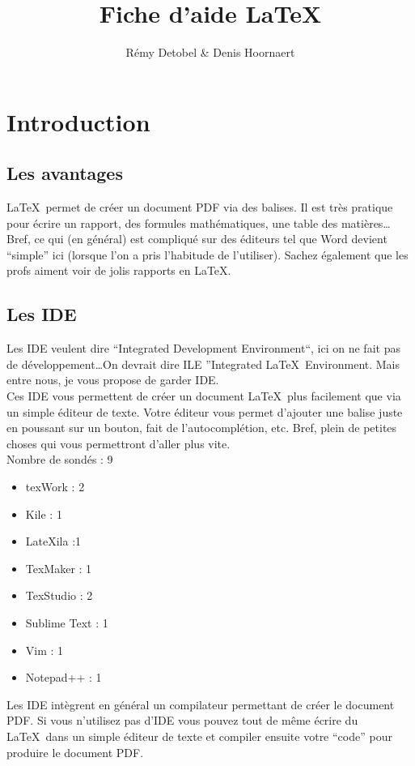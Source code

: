 \documentclass[a4paper,11pt]{article}
\title{Fiche d'aide \LaTeX}
\author{Rémy Detobel \& Denis Hoornaert}
\begin{document}
\maketitle

\newpage
\tableofcontents
\newpage


\section{Introduction}
  \subsection{Les avantages}
    \LaTeX\ permet de créer un document PDF via des balises.  Il est très pratique pour écrire un rapport, des formules mathématiques, une table des matières\ldots  Bref, ce qui (en général) est compliqué sur des éditeurs tel que Word devient ``simple'' ici (lorsque l'on a pris l'habitude de l'utiliser).  Sachez également que les profs aiment voir de jolis rapports en \LaTeX.

  \subsection{Les IDE}
    Les IDE veulent dire ``Integrated Development Environment``, ici on ne fait pas de développement\ldots On devrait dire ILE ''Integrated \LaTeX\ Environment.  Mais entre nous, je vous propose de garder IDE.\\
    Ces IDE vous permettent de créer un document \LaTeX\ plus facilement que via un simple éditeur de texte.  Votre éditeur vous permet d'ajouter une balise juste en poussant sur un bouton, fait de l'autocomplétion, etc.  Bref, plein de petites choses qui vous permettront d'aller plus vite.\\
    Nombre de sondés : 9
    \begin{itemize}
      \item texWork : 2
      \item Kile : 1
      \item LateXila :1
      \item TexMaker : 1
      \item TexStudio : 2
      \item Sublime Text : 1
      \item Vim : 1  %
      \item Notepad++ : 1
    \end{itemize}
    Les IDE intègrent en général un compilateur permettant de créer le document PDF.  Si vous n'utilisez pas d'IDE vous pouvez tout de même écrire du \LaTeX\ dans un simple éditeur de texte et compiler ensuite votre ``code'' pour produire le document PDF.
\end{document}
